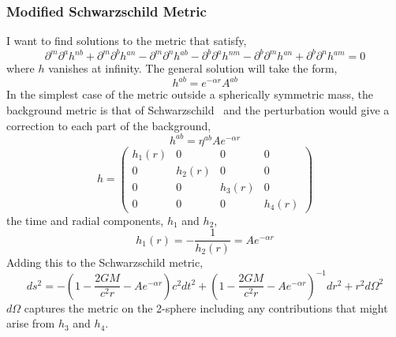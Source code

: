 \documentclass[aps,prd,preprint]{revtex4-1}
\begin{document}
\subsubsection*{Modified Schwarzschild Metric}
I want to find solutions to the metric that satisfy,
\begin{equation}\label{h_wave_equation}
    \partial^m\partial^{a}h^{nb} + \partial^m\partial^{b}h^{an} - \partial^m\partial^{n}h^{ab} - \partial^b\partial^{a}h^{nm} - \partial^b\partial^{m}h^{an} + \partial^b\partial^{n}h^{am} = 0
\end{equation}
where $h$ vanishes at infinity. The general solution will take the form,
\begin{equation}\label{h_wave_solution}
    h^{ab} = e^{-\alpha r}A^{ab}
\end{equation}
In the simplest case of the metric outside a spherically symmetric mass, the background metric is that of Schwarzschild~\cite{kruskal_1960} and the perturbation would give a correction to each part of the background,
\begin{equation}\label{corrections_to_Schwarzschild}
    h^{ab} = \eta^{ab}Ae^{-\alpha r}
\end{equation}
\begin{equation}
    h = \begin{pmatrix}
        h_{1}(r) & 0 & 0 & 0 \\
        0 & h_{2}(r) & 0 & 0 \\
        0 & 0 & h_{3}(r) & 0 \\
        0 & 0 & 0 & h_{4}(r)
    \end{pmatrix}
\end{equation}
the time and radial components, $h_{1}$ and $h_{2}$,
\begin{equation}
    h_{1}(r) = - \frac{1}{h_{2}(r)} = Ae^{-\alpha r}
\end{equation}
Adding this to the Schwarzschild metric,
\begin{equation}
    ds^2 = -\left( 1 - \frac{2GM}{c^2r} - Ae^{-\alpha r} \right) c^2 dt^2 + \left( 1 - \frac{2GM}{c^2r} - Ae^{-\alpha r} \right)^{-1} dr^2 + r^2 d\Omega^2
\end{equation}
$d\Omega$ captures the metric on the 2-sphere including any contributions that might arise from $h_{3}$ and $h_{4}$.
\\
\end{document}
